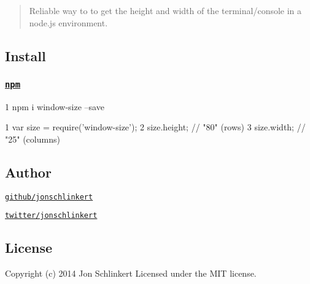 \begin{quote}
Reliable way to to get the height and width of the terminal/console in a node.\+js environment. \end{quote}


\subsection*{Install}

\subsubsection*{\href{npmjs.org}{\tt npm}}


\begin{DoxyCode}
1 npm i window-size --save
\end{DoxyCode}



\begin{DoxyCode}
1 var size = require('window-size');
2 size.height; // "80" (rows)
3 size.width; // "25" (columns)
\end{DoxyCode}


\subsection*{Author}


\begin{DoxyItemize}
\item \href{https://github.com/jonschlinkert}{\tt github/jonschlinkert}
\item \href{http://twitter.com/jonschlinkert}{\tt twitter/jonschlinkert}
\end{DoxyItemize}

\subsection*{License}

Copyright (c) 2014 Jon Schlinkert Licensed under the M\+I\+T license. 